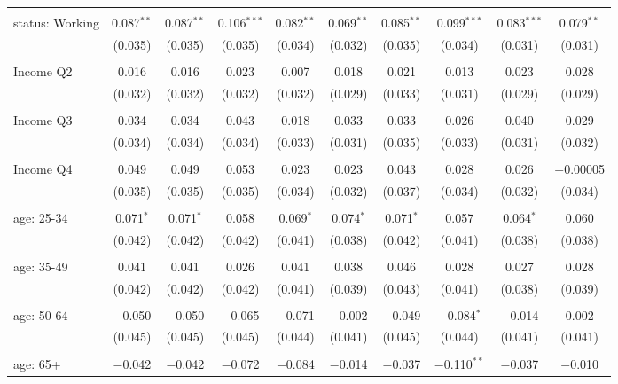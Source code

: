 \begin{tabular}{@{\extracolsep{5pt}}lccccccccc}
  & & & & & & & & & \\ 
 status: Working & 0.087$^{**}$ & 0.087$^{**}$ & 0.106$^{***}$ & 0.082$^{**}$ & 0.069$^{**}$ & 0.085$^{**}$ & 0.099$^{***}$ & 0.083$^{***}$ & 0.079$^{**}$ \\ 
  & (0.035) & (0.035) & (0.035) & (0.034) & (0.032) & (0.035) & (0.034) & (0.031) & (0.031) \\ 
  & & & & & & & & & \\ 
 Income Q2 & 0.016 & 0.016 & 0.023 & 0.007 & 0.018 & 0.021 & 0.013 & 0.023 & 0.028 \\ 
  & (0.032) & (0.032) & (0.032) & (0.032) & (0.029) & (0.033) & (0.031) & (0.029) & (0.029) \\ 
  & & & & & & & & & \\ 
 Income Q3 & 0.034 & 0.034 & 0.043 & 0.018 & 0.033 & 0.033 & 0.026 & 0.040 & 0.029 \\ 
  & (0.034) & (0.034) & (0.034) & (0.033) & (0.031) & (0.035) & (0.033) & (0.031) & (0.032) \\ 
  & & & & & & & & & \\ 
 Income Q4 & 0.049 & 0.049 & 0.053 & 0.023 & 0.023 & 0.043 & 0.028 & 0.026 & $-$0.00005 \\ 
  & (0.035) & (0.035) & (0.035) & (0.034) & (0.032) & (0.037) & (0.034) & (0.032) & (0.034) \\ 
  & & & & & & & & & \\ 
 age: 25-34 & 0.071$^{*}$ & 0.071$^{*}$ & 0.058 & 0.069$^{*}$ & 0.074$^{*}$ & 0.071$^{*}$ & 0.057 & 0.064$^{*}$ & 0.060 \\ 
  & (0.042) & (0.042) & (0.042) & (0.041) & (0.038) & (0.042) & (0.041) & (0.038) & (0.038) \\ 
  & & & & & & & & & \\ 
 age: 35-49 & 0.041 & 0.041 & 0.026 & 0.041 & 0.038 & 0.046 & 0.028 & 0.027 & 0.028 \\ 
  & (0.042) & (0.042) & (0.042) & (0.041) & (0.039) & (0.043) & (0.041) & (0.038) & (0.039) \\ 
  & & & & & & & & & \\ 
 age: 50-64 & $-$0.050 & $-$0.050 & $-$0.065 & $-$0.071 & $-$0.002 & $-$0.049 & $-$0.084$^{*}$ & $-$0.014 & 0.002 \\ 
  & (0.045) & (0.045) & (0.045) & (0.044) & (0.041) & (0.045) & (0.044) & (0.041) & (0.041) \\ 
  & & & & & & & & & \\ 
 age: 65+ & $-$0.042 & $-$0.042 & $-$0.072 & $-$0.084 & $-$0.014 & $-$0.037 & $-$0.110$^{**}$ & $-$0.037 & $-$0.010 \\ 

\end{tabular}

